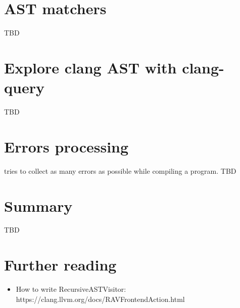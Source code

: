 
\section{AST matchers}
TBD

\section{Explore clang AST with clang-query}

TBD

\section{Errors processing}
\clang tries to collect as many errors as possible while compiling a program.
TBD

\section{Summary}

TBD


\section{Further reading}
\begin{itemize}
  \item How to write RecursiveASTVisitor: https://clang.llvm.org/docs/RAVFrontendAction.html
\end{itemize}


